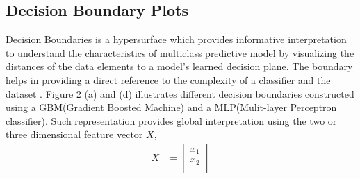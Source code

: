 \documentclass{article}
\begin{document}
\subsection{Decision Boundary Plots}
Decision Boundaries is a hypersurface which provides informative interpretation to understand the characteristics of multiclass predictive model by visualizing the distances of the data elements to a model's learned decision plane. The boundary helps in providing a direct reference to the complexity of a classifier and the dataset \cite{rao1997visualizing} \cite{migut2015visualizing}. Figure 2 (a) and (d) illustrates different decision boundaries constructed using a GBM(Gradient Boosted Machine) and a MLP(Mulit-layer Perceptron classifier).
Such representation provides global interpretation using the two or three dimensional feature vector $X$,
\begin{align}
    X &= \begin{bmatrix}
           x_{1} \\
           x_{2} \\
         \end{bmatrix}
\end{align}
\end{document}
